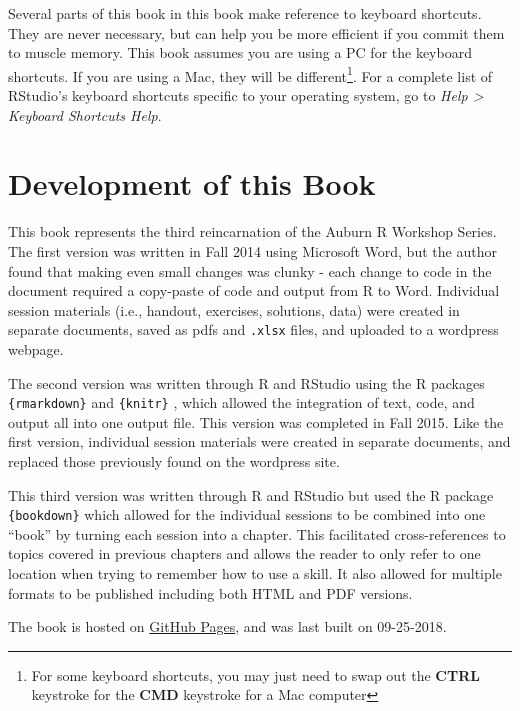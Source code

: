 \documentclass[]{book}
\let\rmarkdownfootnote\footnote%
\def\footnote{\protect\rmarkdownfootnote}
\theoremstyle{definition}
\theoremstyle{definition}
\theoremstyle{definition}
\theoremstyle{remark}
\begin{document}
Several parts of this book in this book make reference to keyboard
shortcuts. They are never necessary, but can help you be more efficient
if you commit them to muscle memory. This book assumes you are using a
PC for the keyboard shortcuts. If you are using a Mac, they will be
different\footnote{For some keyboard shortcuts, you may just need to
  swap out the \textbf{CTRL} keystroke for the \textbf{CMD} keystroke
  for a Mac computer}. For a complete list of RStudio's keyboard
shortcuts specific to your operating system, go to \emph{Help
\textgreater{} Keyboard Shortcuts Help}.

\section*{Development of this Book}\label{development-of-this-book}

This book represents the third reincarnation of the Auburn R Workshop
Series. The first version was written in Fall 2014 using Microsoft Word,
but the author found that making even small changes was clunky - each
change to code in the document required a copy-paste of code and output
from R to Word. Individual session materials (i.e., handout, exercises,
solutions, data) were created in separate documents, saved as pdfs and
\texttt{.xlsx} files, and uploaded to a wordpress webpage.

The second version was written through R and RStudio using the R
packages \texttt{\{rmarkdown\}} \citep{rmarkdown-cite} and
\texttt{\{knitr\}} \citep{knitr-cite}, which allowed the integration of
text, code, and output all into one output file. This version was
completed in Fall 2015. Like the first version, individual session
materials were created in separate documents, and replaced those
previously found on the wordpress site.

This third version was written through R and RStudio but used the R
package \texttt{\{bookdown\}} \citep{bookdown-cite} which allowed for
the individual sessions to be combined into one ``book'' by turning each
session into a chapter. This facilitated cross-references to topics
covered in previous chapters and allows the reader to only refer to one
location when trying to remember how to use a skill. It also allowed for
multiple formats to be published including both HTML and PDF versions.

The book is hosted on \href{https://pages.github.com/}{GitHub Pages},
and was last built on 09-25-2018.
\end{document}
